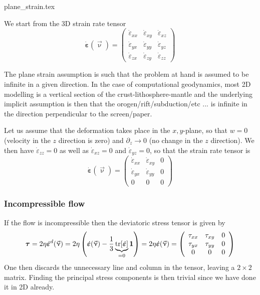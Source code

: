 \begin{flushright} {\tiny {\color{gray} plane\_strain.tex}} \end{flushright}

We start from the 3D strain rate tensor 
\[
\dot{\bm \varepsilon}(\vec\upnu) = 
\left(
\begin{array}{ccc}
\dot{\varepsilon}_{xx} & \dot{\varepsilon}_{xy} & \dot{\varepsilon}_{xz} \\
\dot{\varepsilon}_{yx} & \dot{\varepsilon}_{yy} & \dot{\varepsilon}_{yz} \\
\dot{\varepsilon}_{zx} & \dot{\varepsilon}_{zy} & \dot{\varepsilon}_{zz} 
\end{array}
\right)
\]

The plane strain assumption is such that the problem at hand is assumed to be 
infinite in a given direction. In the case of computational geodynamics, most 2D 
modelling is a vertical section of the crust-lithosphere-mantle
and the underlying implicit assumption is then that the orogen/rift/subduction/etc ... 
is infinite in the direction perpendicular to the screen/paper.  

Let us assume that the deformation takes place in the $x,y$-plane,
so that $w=0$ (velocity in the $z$ direction is zero) and $\partial_z \rightarrow 0$ 
(no change in the $z$ direction).
We then have $\dot{\varepsilon}_{zz}=0$ as well as $\dot{\varepsilon}_{xz}=0$ 
and $\dot{\varepsilon}_{yz}=0$, so that the strain rate tensor is 
\[
\dot{\bm \varepsilon}(\vec\upnu)=
\left( \begin{array}{ccc}
\dot{\varepsilon}_{xx} & \dot{\varepsilon}_{xy} & 0 \\
\dot{\varepsilon}_{yx} & \dot{\varepsilon}_{yy} & 0 \\
0 & 0 & 0
\end{array}\right)
\]

\subsubsection{Incompressible flow}

If the flow is incompressible then the deviatoric stress tensor is given by
\[
\bm\tau 
= 2 \eta \dot{\bm \varepsilon}^d(\vec\upnu)
= 2 \eta \left(\dot{\bm \varepsilon}(\vec\upnu) 
-\frac13 \underbrace{{\rm tr}[\dot{\bm \varepsilon}]}_{=0} 
{\bm 1}\right)
= 2 \eta \dot{\bm \varepsilon}(\vec\upnu) 
=
\left(\begin{array}{ccc}
\tau_{xx} & \tau_{xy} & 0 \\
\tau_{yx} & \tau_{yy} & 0 \\
0 & 0 & 0
\end{array}\right)
\]
One then discards the unnecessary line and column in the tensor, leaving a $2\times 2$ matrix.
Finding the principal stress components is then trivial since we have done it in 2D already.


